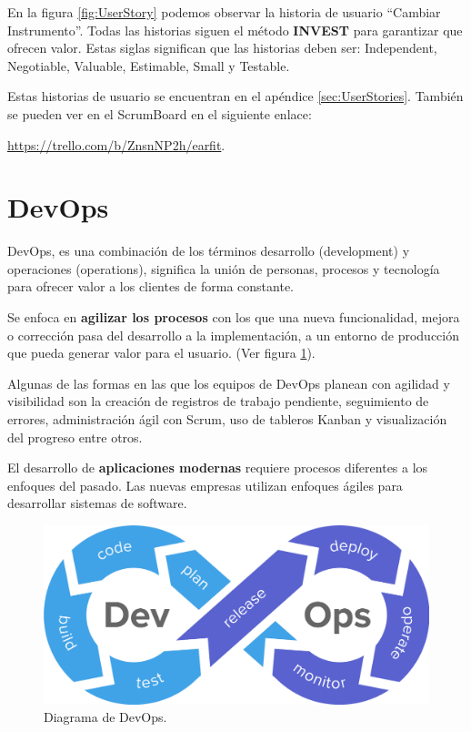 \documentclass[12pt,twoside,titlepage]{report}
\begin{document}
En la figura \ref{fig:UserStory} podemos observar la historia de usuario ``Cambiar Instrumento''.
Todas las historias siguen el método \textbf{INVEST} para garantizar que ofrecen valor. Estas siglas significan que las historias deben ser: Independent, Negotiable, Valuable, Estimable, Small y Testable.

Estas historias de usuario se encuentran en el apéndice \ref{sec:UserStories}. También se pueden ver en el ScrumBoard en el siguiente enlace: 

\url{https://trello.com/b/ZnsnNP2h/earfit}.



\section{DevOps}

DevOps, es una combinación de los términos desarrollo (development) y operaciones (operations), significa la unión de personas, procesos y tecnología para ofrecer valor a los clientes de forma constante.

Se enfoca en \textbf{agilizar los procesos} con los que una nueva funcionalidad, mejora o corrección pasa del desarrollo a la implementación, a un entorno de producción que pueda generar valor para el usuario.
(Ver figura \ref{fig:DevOps}).

Algunas de las formas en las que los equipos de DevOps planean con agilidad y visibilidad son la creación de registros de trabajo pendiente, seguimiento de errores, administración ágil con Scrum, uso de tableros Kanban y visualización del progreso entre otros.

El desarrollo de \textbf{aplicaciones modernas} requiere procesos diferentes a los enfoques del pasado. Las nuevas empresas utilizan enfoques ágiles para desarrollar sistemas de software.

\begin{figure}[H]
    \centering
    \includegraphics[scale=0.2]{DevOps/DevOps}
    \caption{Diagrama de DevOps.}
    \label{fig:DevOps}
\end{figure}
\end{document}
